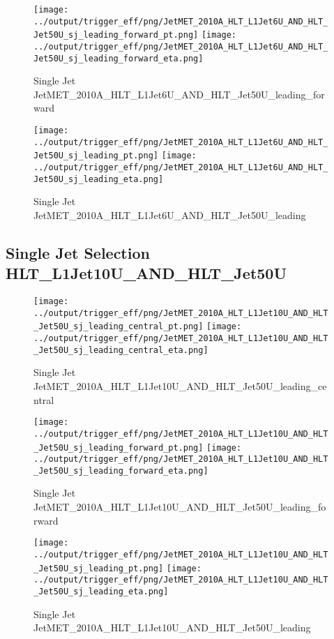 \documentclass[11pt]{article}
\begin{document}
\begin{figure}[ht]
\centering
\texttt{[image: ../output/trigger\_eff/png/JetMET\_2010A\_HLT\_L1Jet6U\_AND\_HLT\_Jet50U\_sj\_leading\_forward\_pt.png]}
\texttt{[image: ../output/trigger\_eff/png/JetMET\_2010A\_HLT\_L1Jet6U\_AND\_HLT\_Jet50U\_sj\_leading\_forward\_eta.png]}
\caption{Single Jet JetMET\_2010A\_HLT\_L1Jet6U\_AND\_HLT\_Jet50U\_leading\_forward}
\label{fig:jetmet_sj_L1Jet6U_AND_HLT_Jet50U_leading_forward}
\end{figure}

\begin{figure}[ht]
\centering
\texttt{[image: ../output/trigger\_eff/png/JetMET\_2010A\_HLT\_L1Jet6U\_AND\_HLT\_Jet50U\_sj\_leading\_pt.png]}
\texttt{[image: ../output/trigger\_eff/png/JetMET\_2010A\_HLT\_L1Jet6U\_AND\_HLT\_Jet50U\_sj\_leading\_eta.png]}
\caption{Single Jet JetMET\_2010A\_HLT\_L1Jet6U\_AND\_HLT\_Jet50U\_leading}
\label{fig:jetmet_sj_L1Jet6U_AND_HLT_Jet50U_leading}
\end{figure}


\newpage
\subsection{Single Jet Selection HLT\_L1Jet10U\_AND\_HLT\_Jet50U}
\begin{figure}[ht]
\centering
\texttt{[image: ../output/trigger\_eff/png/JetMET\_2010A\_HLT\_L1Jet10U\_AND\_HLT\_Jet50U\_sj\_leading\_central\_pt.png]}
\texttt{[image: ../output/trigger\_eff/png/JetMET\_2010A\_HLT\_L1Jet10U\_AND\_HLT\_Jet50U\_sj\_leading\_central\_eta.png]}
\caption{Single Jet JetMET\_2010A\_HLT\_L1Jet10U\_AND\_HLT\_Jet50U\_leading\_central}
\label{fig:jetmet_sj_L1Jet10U_AND_HLT_Jet50U_leading_central}
\end{figure}

\begin{figure}[ht]
\centering
\texttt{[image: ../output/trigger\_eff/png/JetMET\_2010A\_HLT\_L1Jet10U\_AND\_HLT\_Jet50U\_sj\_leading\_forward\_pt.png]}
\texttt{[image: ../output/trigger\_eff/png/JetMET\_2010A\_HLT\_L1Jet10U\_AND\_HLT\_Jet50U\_sj\_leading\_forward\_eta.png]}
\caption{Single Jet JetMET\_2010A\_HLT\_L1Jet10U\_AND\_HLT\_Jet50U\_leading\_forward}
\label{fig:jetmet_sj_L1Jet10U_AND_HLT_Jet50U_leading_forward}
\end{figure}

\begin{figure}[ht]
\centering
\texttt{[image: ../output/trigger\_eff/png/JetMET\_2010A\_HLT\_L1Jet10U\_AND\_HLT\_Jet50U\_sj\_leading\_pt.png]}
\texttt{[image: ../output/trigger\_eff/png/JetMET\_2010A\_HLT\_L1Jet10U\_AND\_HLT\_Jet50U\_sj\_leading\_eta.png]}
\caption{Single Jet JetMET\_2010A\_HLT\_L1Jet10U\_AND\_HLT\_Jet50U\_leading}
\label{fig:jetmet_sj_L1Jet10U_AND_HLT_Jet50U_leading}
\end{figure}
\end{document}
